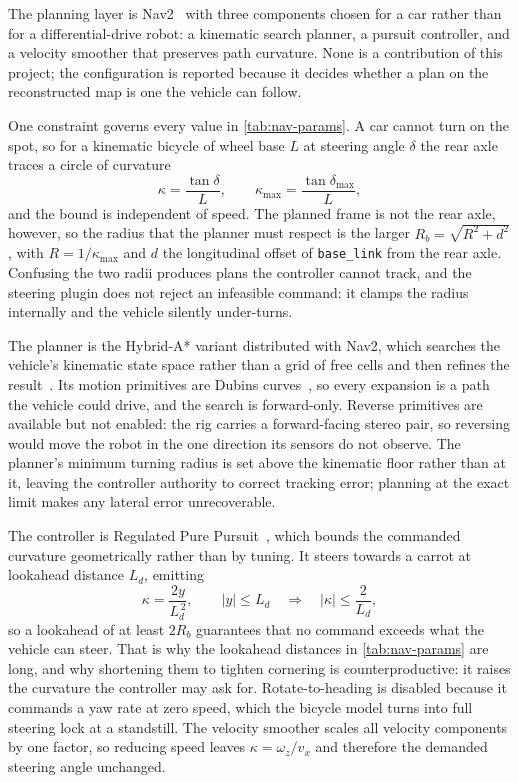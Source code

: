 The planning layer is Nav2~\cite{macenski2020} with three components chosen for a
car rather than for a differential-drive robot: a kinematic search planner, a
pursuit controller, and a velocity smoother that preserves path curvature. None
is a contribution of this project; the configuration is reported because it
decides whether a plan on the reconstructed map is one the vehicle can follow.

One constraint governs every value in \cref{tab:nav-params}. A car cannot turn
on the spot, so for a kinematic bicycle of wheel base $L$ at steering angle
$\delta$ the rear axle traces a circle of curvature
\begin{equation}
  \kappa = \frac{\tan \delta}{L},
  \qquad
  \kappa_{\max} = \frac{\tan \delta_{\max}}{L},
  \label{eq:curvature-bound}
\end{equation}
and the bound is independent of speed. The planned frame is not the rear axle,
however, so the radius that the planner must respect is the larger
$R_b = \sqrt{R^2 + d^2}$, with $R = 1/\kappa_{\max}$ and $d$ the longitudinal
offset of \texttt{base\_link} from the rear axle. Confusing the two radii
produces plans the controller cannot track, and the steering plugin does not
reject an infeasible command: it clamps the radius internally and the vehicle
silently under-turns.

The planner is the Hybrid-A* variant distributed with Nav2, which searches the
vehicle's kinematic state space rather than a grid of free cells and then
refines the result~\cite{dolgov2010}. Its motion primitives are Dubins
curves~\cite{dubins1957}, so every expansion is a path the vehicle could drive,
and the search is forward-only. Reverse primitives are available but not
enabled: the rig carries a forward-facing stereo pair, so reversing would move
the robot in the one direction its sensors do not observe. The planner's
minimum turning radius is set above the kinematic floor rather than at it,
leaving the controller authority to correct tracking error; planning at the
exact limit makes any lateral error unrecoverable.

The controller is Regulated Pure Pursuit~\cite{macenski2023rpp}, which bounds
the commanded curvature geometrically rather than by tuning. It steers towards a
carrot at lookahead distance $L_d$, emitting
\begin{equation}
  \kappa = \frac{2y}{L_d^{\,2}}, \qquad |y| \le L_d
  \quad\Longrightarrow\quad
  |\kappa| \le \frac{2}{L_d},
  \label{eq:rpp-curvature}
\end{equation}
so a lookahead of at least $2R_b$ guarantees that no command exceeds what the
vehicle can steer. That is why the lookahead distances in
\cref{tab:nav-params} are long, and why shortening them to tighten cornering is
counterproductive: it raises the curvature the controller may ask for.
Rotate-to-heading is disabled because it commands a yaw rate at zero speed,
which the bicycle model turns into full steering lock at a standstill. The
velocity smoother scales all velocity components by one factor, so reducing
speed leaves $\kappa = \omega_z/v_x$ and therefore the demanded steering angle
unchanged.

